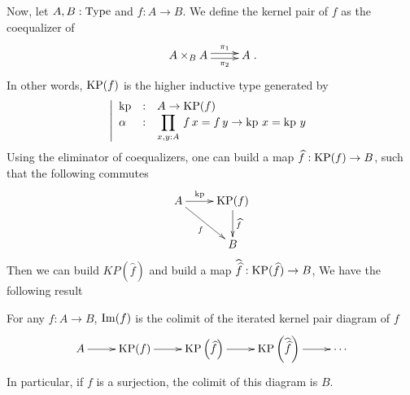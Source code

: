 Now, let $A,B:\operatorname{Type}$ and $f:A\to B$. We define the kernel pair of $f$
as the coequalizer of \[ \xymatrix{ A\times_B A \ar@<-.5ex>[r]_-{\pi_2}
      \ar@<.5ex>[r]^-{\pi_1} & A }.\]
In other words, $\operatorname{KP}(f)$ is the higher inductive type generated by
\[\left|
    \begin{array}{lll}
      \operatorname{kp} &:& A\to \operatorname{KP}(f) \\
      \alpha &:& \displaystyle{\prod_{x,y:A}\, f\, x = f\, y \to \operatorname{kp}\,x=\operatorname{kp}\,y}
    \end{array}
  \right.\]
Using the eliminator of coequalizers, one can build a map $\widehat
f:\operatorname{KP}(f) \to B$, such that the following commutes
\[\xymatrix{
    A \ar[r]^-{\kp} \ar[rd]_-f & \KP(f) \ar[d]^-{\widehat f} \\
    &B
}\]
Then we can build $KP(\widehat f)$ and build a map $\widehat{\widehat
  f}:\operatorname{KP}(\widehat f) \to B$, \etc{}
We have the following result
\begin{prop}\label{prop:cech'}
  For any $f:A\to B$, $\operatorname{Im}(f)$ is the colimit of the iterated kernel
  pair diagram of $f$
\[\xymatrix{
  A \ar[r] & \KP(f) \ar[r] & \KP\left(\widehat f\right) \ar[r]& \KP\left(\widehat{\widehat f}\right) \ar[r]& \cdots
}\]
In particular, if $f$ is a surjection, the colimit of this diagram is $B$.
\end{prop}
